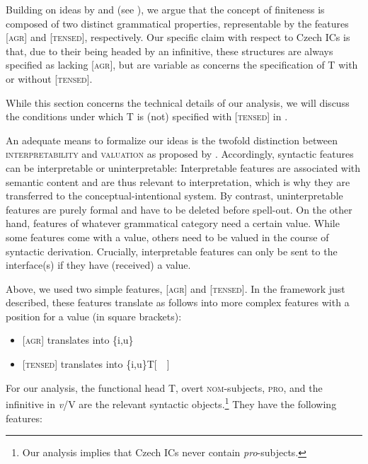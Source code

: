 \documentclass[output=paper,colorlinks,citecolor=brown,
modfonts,newtxmath
]{langscibook}
\begin{document}
Building on ideas by \citet{Stowell1982,Stowell1995} and \citet{Wurmbrand2001} (see ), we argue that the concept of finiteness is composed of two distinct grammatical properties, representable by the features [\textsc{agr}] and [\textsc{tensed}], respectively. Our specific claim with respect to Czech ICs is that, due to their being headed by an infinitive, these structures are always specified as lacking [\textsc{agr}], but are variable as concerns the specification of T with or without [\textsc{tensed}].

While this section concerns the technical details of our analysis, we will discuss the conditions under which T is (not) specified with [\textsc{tensed}] in . 

An adequate means to formalize our ideas is the twofold distinction between \textsc{interpretability} and \textsc{valuation} as proposed by \citet{PesetskyTorrego2001}. Accordingly, syntactic features can be interpretable or uninterpretable: Interpretable features are associated with semantic content and are thus relevant to interpretation, which is why they are transferred to the conceptual-intentional system. By contrast, uninterpretable features are purely formal and have to be deleted before spell-out. On the other hand, features of whatever grammatical category need a certain value. While some features come with a value, others need to be valued in the course of syntactic derivation. Crucially, interpretable features can only be sent to the interface(s) if they have (received) a value.

Above, we used two simple features, [\textsc{agr}] and [\textsc{tensed}]. In the framework just described, these features translate as follows into more complex features with a position for a value (in square brackets):

\begin{itemize}

\item {[}\textsc{agr}] translates into \{i,u\}\textPhi[~~]

\item {[}\textsc{tensed}] translates into \{i,u\}T[~~]

\end{itemize}

\noindent For our analysis, the functional head T, overt \textsc{nom}-subjects, \textsc{pro}, and the infinitive in \textit{v}/V are the relevant syntactic objects.\footnote{Our analysis implies that Czech ICs never contain \textit{pro}-subjects.} They have the following features:
\end{document}
